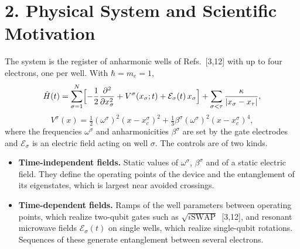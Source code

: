 \documentclass[12pt,a4paper]{article}
\begin{document}
\section*{2. Physical System and Scientific Motivation}

The system is the register of anharmonic wells of Refs.~[3,12] with
up to four electrons, one per well.  With $\hbar=m_e=1$,
\[
  \hat H(t)=\sum_{\sigma=1}^{N}\Bigl[-\frac12\frac{\partial^2}{\partial x_\sigma^2}
  +V^{\sigma}(x_\sigma;t)+\mathcal E_\sigma(t)\,x_\sigma\Bigr]
  +\sum_{\sigma<\tau}\frac{\kappa}{|x_\sigma-x_\tau|},
\]
\[
  V^{\sigma}(x)=\tfrac12(\omega^{\sigma})^2(x-x_c^{\sigma})^2
  +\tfrac13\beta^{\sigma}(\omega^{\sigma})^2(x-x_c^{\sigma})^4 ,
\]
where the frequencies $\omega^\sigma$ and anharmonicities
$\beta^\sigma$ are set by the gate electrodes and $\mathcal E_\sigma$
is an electric field acting on well $\sigma$.  The controls are of two
kinds.
\begin{itemize}
  \item \textbf{Time-independent fields.}  Static values of
  $\omega^\sigma$, $\beta^\sigma$ and of a static electric field.
  They define the operating points of the device and the entanglement
  of its eigenstates, which is largest near avoided crossings.
  \item \textbf{Time-dependent fields.}  Ramps of the well parameters
  between operating points, which realize two-qubit gates such as
  $\sqrt{i\mathrm{SWAP}}$~[3,12], and resonant microwave fields
  $\mathcal E_\sigma(t)$ on single wells, which realize single-qubit
  rotations.  Sequences of these generate entanglement between
  several electrons.
\end{itemize}
\end{document}
